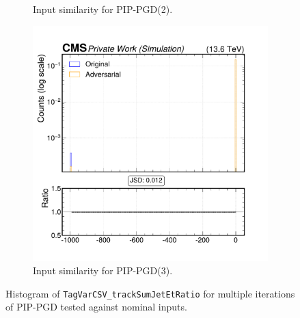 \begin{figure}[h]
\begin{subfigure}[t]{0.32\textwidth}
    \caption*{Input similarity for PIP-PGD(2).}
  \end{subfigure}\hfill
  \begin{subfigure}[t]{0.32\textwidth}
    \includegraphics[width=\linewidth]{media/output/features/compare/combined_it_3/cmp_global_features_TagVarCSV_trackSumJetEtRatio.pdf}
    \caption*{Input similarity for PIP-PGD(3).}
  \end{subfigure}

  \caption*{Histogram of \texttt{TagVarCSV\_trackSumJetEtRatio} for multiple iterations of PIP-PGD tested against nominal inputs.}
  \label{fig:combined_input_TagVarCSV_trackSumJetEtRatio}
\end{figure}

